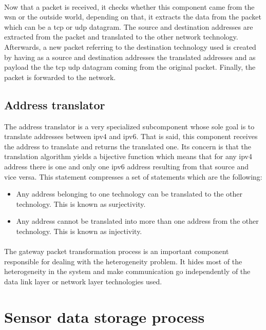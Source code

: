 \documentclass[oneside,12pt,a4paper,final]{book}
\begin{document}
\paragraph{}
Now that a packet is received, it checks whether this component came from the \gls{wsn} or the outside world, depending on that, it extracts the data from the packet which can be a \gls{tcp} or \gls{udp} datagram. The source and destination addresses are extracted from the packet and translated to the other network technology. Afterwards, a new packet referring to the destination technology used is created by having as a source and destination addresses the translated addresses and as payload the the \gls{tcp} \gls{udp} datagram coming from the original packet. Finally, the packet is forwarded to the network.
\subsection{Address translator}
The address translator is a very specialized subcomponent whose sole goal is to translate addresses between \gls{ipv4} and \gls{ipv6}. That is said, this component receives the address to translate and returns the translated one. Its concern is that the translation algorithm yields a bijective function which means that for any \gls{ipv4} address there is one and only one \gls{ipv6} address resulting from that source and vice versa. This statement compresses a set of statements which are the following:

\begin{itemize}
\item Any address belonging to one technology can be translated to the other technology. This is known as surjectivity.
\item Any address cannot be translated into more than one address from the other technology. This is known as injectivity.
\end{itemize}
\paragraph{}
The gateway packet transformation process is an important component responsible for dealing with the heterogeneity problem. It hides most of the heterogeneity in the system and make communication go independently of the data link layer or network layer technologies used.

\section{Sensor data storage process}
\end{document}
